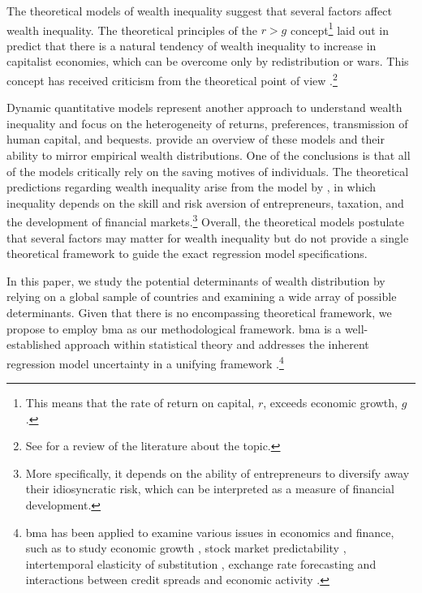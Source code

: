 \documentclass[a4paper,11pt]{article}
\begin{document}
The theoretical models of wealth inequality suggest that several factors affect wealth inequality. The theoretical principles of the $r > g$ concept\footnote{This means that the rate of return on capital, $r$, exceeds economic growth, $g$.} laid out in \citet{piketty2014} predict that there is a natural tendency of wealth inequality to increase in capitalist economies, which can be overcome only by redistribution or wars. This concept has received criticism from the theoretical point of view \citep{blume2015capital,mankiw2015yes}.\footnote{See \citet{king2017literature} for a review of the literature about the topic.} 

Dynamic quantitative models represent another approach to understand wealth inequality and focus on the heterogeneity of returns, preferences, transmission of human capital, and bequests. \citet{DENARDI2017280} provide an overview of these models and their ability to mirror empirical wealth distributions. One of the conclusions is that all of the models critically rely on the saving motives of individuals. The theoretical predictions regarding wealth inequality arise from the model by \citet{pastor2016income}, in which inequality depends on the skill and risk aversion of entrepreneurs, taxation, and the development of financial markets.\footnote{More specifically, it depends on the ability of entrepreneurs to diversify away their idiosyncratic risk, which can be interpreted as a measure of financial development.} Overall, the theoretical models postulate that several factors may matter for wealth inequality but do not provide a single theoretical framework to guide the exact regression model specifications. 

In this paper, we study the potential determinants of wealth distribution by relying on a global sample of countries and examining a wide array of possible determinants. Given that there is no encompassing theoretical framework, we propose to employ \ac{bma} as our methodological framework. \ac{bma} is a well-established approach within statistical theory and addresses the inherent regression model uncertainty in a unifying framework \citep{Koopetal2007,Rafteryetal1997}.\footnote{\ac{bma} has been applied to examine various issues in economics and finance, such as to study economic growth \citep{Durlaufetal2008,Fernandezetal2001}, stock market predictability  \citep{avramov,cremers}, intertemporal elasticity of substitution \citep{Havraneketal2015}, exchange rate forecasting \citep{wright} and interactions between credit spreads and economic activity \citep{faust2013}.} 
\end{document}
